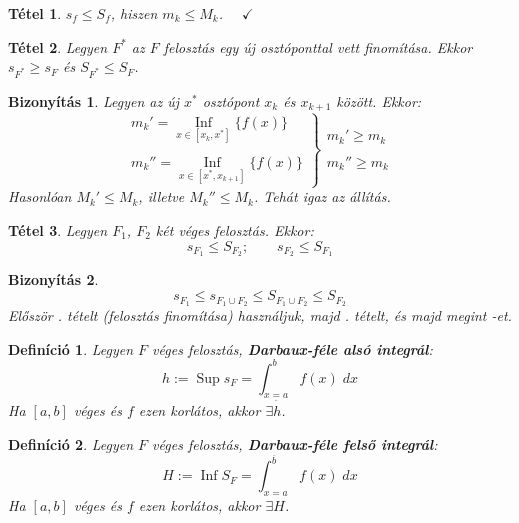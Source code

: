 \documentclass[a4paper,12pt,twoside]{book}
\DeclareMathOperator{\Inf}{Inf}
\DeclareMathOperator{\Sup}{Sup}
\newtheorem{tetel}{Tétel}[chapter]
\newtheorem{defi}{Definíció}[chapter]
\theoremstyle{break}
\newtheorem{biz}{Bizonyítás}[chapter]
\theoremstyle{plain}
\newtheorem{bizNoNL}[biz]{Bizonyítás}
\begin{document}
\begin{tetel}\label{AlsoKisebbMintFelsoKozOsszeg}
 $s_f \leqslant S_f$, hiszen $m_k \leqslant M_k$. $\quad \checkmark$
\end{tetel}
\addtocounter{biz}{1}

\begin{tetel}\label{FelosztasFinomitasa}
 Legyen $F^*$ az $F$ felosztás egy új osztóponttal vett finomítása. Ekkor $s_{F^*} \geqslant s_F$ és $S_{F^*} \leqslant S_F$.
\end{tetel}
\begin{biz}
 Legyen az új $x^*$ osztópont $x_k$ és $x_{k+1}$ között. Ekkor:
  \[\left.\begin{array}{r}
    m_k' = \underset{x\in [x_k, x^*]}{\Inf}\big\{f(x)\big\}\\\\[-5pt]
    m_k'' = \underset{x\in [x^*, x_{k+1}]}{\Inf}\big\{f(x)\big\}
   \end{array}\right\} \begin{array}{l}
     m_k' \geqslant m_k\\\\[-5pt]
     m_k'' \geqslant m_k
   \end{array}
\]
Hasonlóan $M_k' \leqslant M_k$, illetve $M_k'' \leqslant M_k$. Tehát igaz az állítás.
\end{biz}

\begin{tetel}
 Legyen $F_1$, $F_2$ két véges felosztás. Ekkor:
  \[s_{F_1} \leqslant S_{F_2}; \qquad s_{F_2} \leqslant S_{F_1}\]
\end{tetel}
\begin{bizNoNL}
 \[s_{F_1} \leqslant s_{F_1\cup F_2} \leqslant S_{F_1\cup F_2} \leqslant S_{F_2}\]
Először . tételt (felosztás finomítása) használjuk, majd . tételt, és majd megint -et.
\end{bizNoNL}

\begin{defi}
 Legyen $F$ véges felosztás, \textbf{Darbaux-féle alsó integrál}:
  \[h := \Sup s_F = \int^{b}_{\underline{x=a}} f(x)\; dx\]
  Ha $[a,b]$ véges és $f$ ezen korlátos, akkor $\exists h$.
\end{defi}
\begin{defi}
 Legyen $F$ véges felosztás, \textbf{Darbaux-féle felső integrál}:
  \[H := \Inf S_F = \int^{\overline{b}}_{x=a} f(x)\; dx\]
  Ha $[a,b]$ véges és $f$ ezen korlátos, akkor $\exists H$.
\end{defi}
\end{document}
